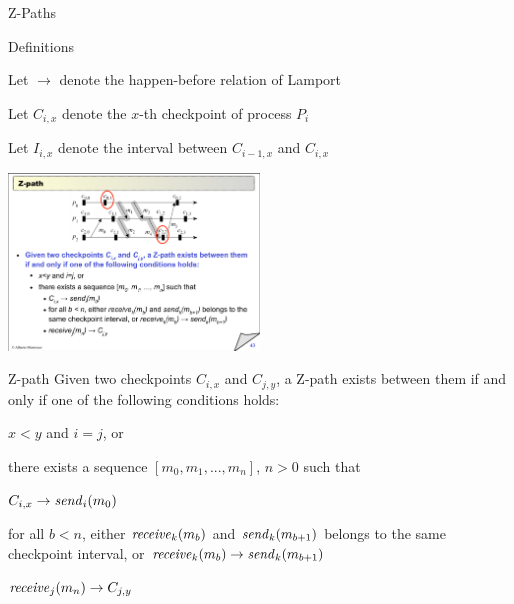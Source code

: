 \begin{frame}{Z-Paths}

\begin{overprint}
\begin{block}{Definitions}
\BI 
\item Let $\rightarrow$ denote the happen-before relation of Lamport
\item Let $C_{i,x}$ denote the $x$-th checkpoint of process $P_i$
\item Let $I_{i,x}$ denote the interval between $C_{i-1,x}$ and $C_{i,x}$
\EI
\end{block}
\begin{center}
\includegraphics[width=0.5\textwidth]{zpath1}
\end{center}
\end{overprint}

\vspace{-66pt}
\begin{block}{Z-path}
Given two checkpoints $C_{i,x}$ and $C_{j,y}$, a \alert{Z-path} exists between them if 
and only if one of the following conditions holds:
\BI
\item $x<y$ and $i=j$, or
\item there exists a sequence $[m_0, m_1, ..., m_n]$, $n>0$ such that
	\BI
	\item $C_{i,x} \rightarrow \mathit{send}_i(m_0)$
	\item for all $b < n$, either $\mathit{receive}_k(m_b)$ and $\mathit{send}_k(m_{b+1})$ belongs 
	to the same checkpoint interval, or $\mathit{receive}_k(m_b) \rightarrow \mathit{send}_k(m_{b+1})$
	\item $\mathit{receive}_j(m_n) \rightarrow C_{j,y}$
	\EI
\EI
\end{block}

\end{frame}

